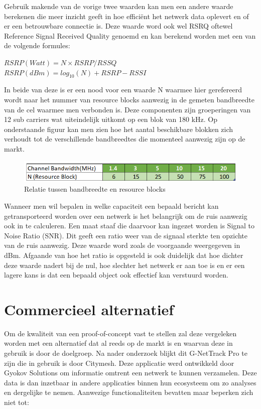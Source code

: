 Gebruik makende van de vorige twee waarden kan men een andere waarde berekenen die meer inzicht geeft in hoe efficiënt het netwerk data oplevert en of er een betrouwbare connectie is. \autocite{Apostu2024} Deze waarde word ook wel RSRQ oftewel Reference Signal Received Quality genoemd en kan berekend worden met een van de volgende formules:

$ RSRP (Watt) = N \times RSRP / RSSQ $ \\
$ RSRP (dBm) = log_{10} (N) + RSRP - RSSI $

In beide van deze is er een nood voor een waarde N waarmee hier gerefereerd wordt naar het nummer van resource blocks aanwezig in de gemeten bandbreedte van de cel waarmee men verbonden is. \autocite{Kovadloff2021} Deze componenten zijn groeperingen van 12 sub carriers wat uiteindelijk uitkomt op een blok van 180 kHz. \autocite{Mishra2018} Op onderstaande figuur kan men zien hoe het aantal beschikbare blokken zich verhoudt tot de verschillende bandbreedtes die momenteel aanwezig zijn op de markt. 

\begin{figure}[ht]
    \includegraphics[width=1\linewidth]{graphics/bandwithandRB}
    \caption[Relatie tussen bandbreedte en resource blocks]{Relatie tussen bandbreedte en resource blocks \autocite{Kovadloff2021}}
    \label{fig:bandwithandrb}
\end{figure}

Wanneer men wil bepalen in welke capaciteit een bepaald bericht kan getransporteerd worden over een netwerk is het belangrijk om de ruis aanwezig ook in te calculeren. Een maat staaf die daarvoor kan ingezet worden is Signal to Noise Ratio (SNR). Dit geeft een ratio weer van de signaal sterkte ten opzichte van de ruis aanwezig. Deze waarde word zoals de voorgaande weergegeven in dBm. Afgaande van hoe het ratio is opgesteld is ook duidelijk dat hoe dichter deze waarde nadert bij de nul, hoe slechter het netwerk er aan toe is en er een lagere kans is dat een bepaald object ook effectief kan verstuurd worden.  \autocite{Sheldon2021}

\section{Commercieel alternatief}

Om de kwaliteit van een proof-of-concept vast te stellen zal deze vergeleken worden met een alternatief dat al reeds op de markt is en waarvan deze in gebruik is door de doelgroep. Na nader onderzoek blijkt dit G-NetTrack Pro te zijn die in gebruik is door Citymesh. Deze applicatie werd ontwikkeld door Gyokov Solutions om informatie omtrent een netwerk te kunnen verzamelen. Deze data is dan inzetbaar in andere applicaties binnen hun ecosysteem om zo analyses en dergelijke te nemen.\autocite{Solutions2024}  Aanwezige functionaliteiten bevatten maar beperken zich niet tot:

